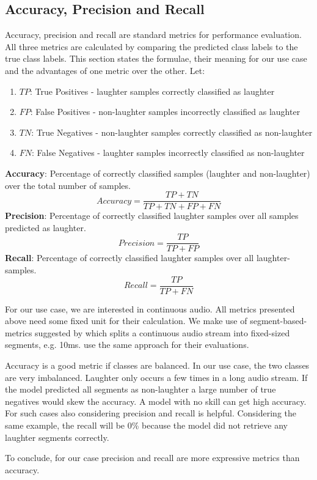 \documentclass[bsc,frontabs,parskip,deptreport]{infthesis}
\begin{document}
\subsection{Accuracy, Precision and Recall} \label{sec:acc-prec-rec}
Accuracy, precision and recall are standard metrics for performance evaluation.
All three metrics are calculated by comparing the predicted class labels to the true class labels.
This section states the formulae, their meaning for our use case and the advantages of one metric over the other.
Let:
\begin{enumerate}
    \item $TP$: True Positives - laughter samples correctly classified as laughter
    \item $FP$: False Positives - non-laughter samples incorrectly classified as laughter
    \item $TN$: True Negatives - non-laughter samples correctly classified as non-laughter
    \item $FN$: False Negatives - laughter samples incorrectly classified as non-laughter
\end{enumerate}
\textbf{Accuracy}: Percentage of correctly classified samples (laughter and non-laughter) over the total number of samples.
$$Accuracy = \frac{TP+TN}{TP+TN+FP+FN}$$
\textbf{Precision}: Percentage of correctly classified laughter samples over all samples predicted as laughter.
$$Precision = \frac{TP}{TP+FP}$$
\textbf{Recall}: Percentage of correctly classified laughter samples over all laughter-samples.
$$Recall = \frac{TP}{TP+FN}$$

For our use case, we are interested in continuous audio. All metrics presented above need some fixed unit for their calculation. We make use of segment-based-metrics suggested by \citep{mesaros2016metrics} which splits a continuous audio stream into fixed-sized segments, e.g. 10ms. \citet{gillick2021robust} use the same approach for their evaluations.

Accuracy is a good metric if classes are balanced. In our use case, the two classes are very imbalanced. Laughter only occurs a few times in a long audio stream. If the model predicted all segments as non-laughter a large number of true negatives would skew the accuracy. A model with no skill can get high accuracy.
For such cases also considering precision and recall is helpful. Considering the same example, the recall will be 0\% because the model did not retrieve any laughter segments correctly. 

To conclude, for our case precision and recall are more expressive metrics than accuracy.
\end{document}
